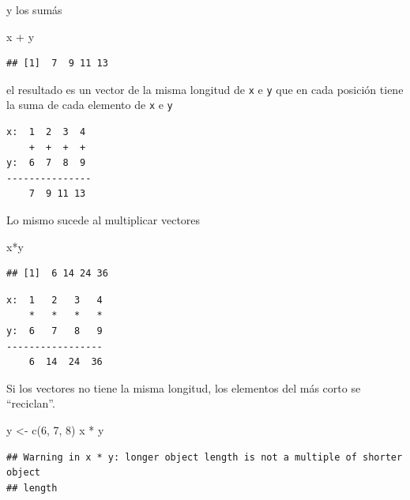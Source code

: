 \documentclass[
  openany]{book}
\newenvironment{Shaded}{\begin{snugshade}}{\end{snugshade}}
\newcommand{\DecValTok}[1]{\textcolor[rgb]{0.00,0.00,0.81}{#1}}
\newcommand{\FunctionTok}[1]{\textcolor[rgb]{0.00,0.00,0.00}{#1}}
\newcommand{\NormalTok}[1]{#1}
\newcommand{\OtherTok}[1]{\textcolor[rgb]{0.56,0.35,0.01}{#1}}
\newcommand{\SpecialCharTok}[1]{\textcolor[rgb]{0.00,0.00,0.00}{#1}}
\begin{document}
y los sumás

\begin{Shaded}
\begin{Highlighting}[]
\NormalTok{x }\SpecialCharTok{+}\NormalTok{ y}
\end{Highlighting}
\end{Shaded}

\begin{verbatim}
## [1]  7  9 11 13
\end{verbatim}

el resultado es un vector de la misma longitud de \texttt{x} e \texttt{y} que en cada posición tiene la suma de cada elemento de \texttt{x} e \texttt{y}

\begin{verbatim}
x:  1  2  3  4
    +  +  +  +
y:  6  7  8  9
---------------
    7  9 11 13
\end{verbatim}

Lo mismo sucede al multiplicar vectores

\begin{Shaded}
\begin{Highlighting}[]
\NormalTok{x}\SpecialCharTok{*}\NormalTok{y}
\end{Highlighting}
\end{Shaded}

\begin{verbatim}
## [1]  6 14 24 36
\end{verbatim}

\begin{verbatim}
x:  1   2   3   4
    *   *   *   *
y:  6   7   8   9
-----------------
    6  14  24  36
\end{verbatim}

Si los vectores no tiene la misma longitud, los elementos del más corto se ``reciclan''.

\begin{Shaded}
\begin{Highlighting}[]
\NormalTok{y }\OtherTok{\textless{}{-}} \FunctionTok{c}\NormalTok{(}\DecValTok{6}\NormalTok{, }\DecValTok{7}\NormalTok{, }\DecValTok{8}\NormalTok{)}
\NormalTok{x }\SpecialCharTok{*}\NormalTok{ y}
\end{Highlighting}
\end{Shaded}

\begin{verbatim}
## Warning in x * y: longer object length is not a multiple of shorter object
## length
\end{verbatim}
\end{document}
